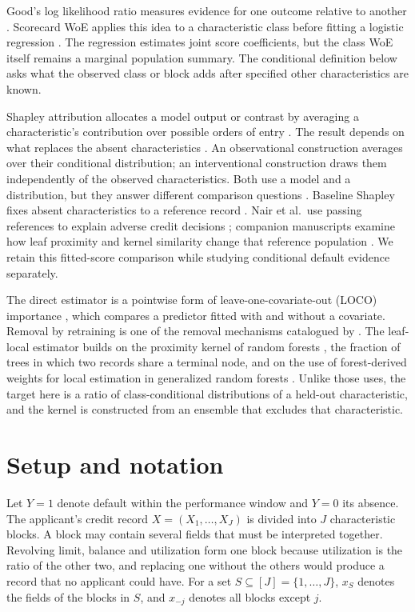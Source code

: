 Good's log likelihood ratio measures evidence for one outcome relative to another \citep{good}. Scorecard WoE applies this idea to a characteristic class before fitting a logistic regression \citep{siddiqi}. The regression estimates joint score coefficients, but the class WoE itself remains a marginal population summary. The conditional definition below asks what the observed class or block adds after specified other characteristics are known.

Shapley attribution allocates a model output or contrast by averaging a characteristic's contribution over possible orders of entry \citep{lundberg,treeshap}. The result depends on what replaces the absent characteristics \citep{baseline,covert}. An observational construction averages over their conditional distribution; an interventional construction draws them independently of the observed characteristics. Both use a model and a distribution, but they answer different comparison questions \citep{janzing,truedata,aas}. Baseline Shapley fixes absent characteristics to a reference record \citep{baseline}. Nair et al.\ use passing references to explain adverse credit decisions \citep{nair}; companion manuscripts examine how leaf proximity and kernel similarity change that reference population \citep{aarcgbdt,aarcneural}. We retain this fitted-score comparison while studying conditional default evidence separately.

The direct estimator is a pointwise form of leave-one-covariate-out (LOCO) importance \citep{loco}, which compares a predictor fitted with and without a covariate. Removal by retraining is one of the removal mechanisms catalogued by \citet{covert}. The leaf-local estimator builds on the proximity kernel of random forests \citep{breiman}, the fraction of trees in which two records share a terminal node, and on the use of forest-derived weights for local estimation in generalized random forests \citep{grf}. Unlike those uses, the target here is a ratio of class-conditional distributions of a held-out characteristic, and the kernel is constructed from an ensemble that excludes that characteristic.

\section{Setup and notation}\label{sec:setup}

Let $Y=1$ denote default within the performance window and $Y=0$ its absence. The applicant's credit record $X=(X_1,\ldots,X_J)$ is divided into $J$ characteristic blocks. A block may contain several fields that must be interpreted together. Revolving limit, balance and utilization form one block because utilization is the ratio of the other two, and replacing one without the others would produce a record that no applicant could have. For a set $S\subseteq[J]=\{1,\ldots,J\}$, $x_S$ denotes the fields of the blocks in $S$, and $x_{-j}$ denotes all blocks except $j$.

